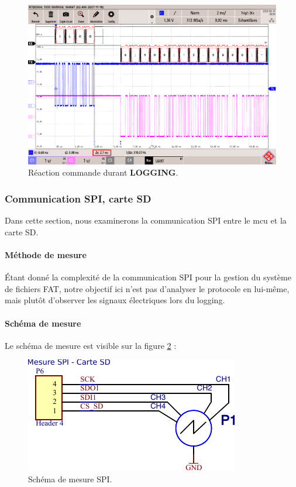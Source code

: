 \begin{figure}[h]
	\centering
	\includegraphics[width=0.7\linewidth]{../figures/mesures/UART-FTDI/comm-uart-ecartLog}
	\caption{Réaction commande durant \textbf{LOGGING}.}
	\label{fig:comm-uart-ecartlog}
\end{figure}



\subsubsection{Communication SPI, carte SD} \label{ssec:Comm-SPI}
Dans cette section, nous examinerons la communication SPI entre le \gls{mcu} et la carte SD.

\paragraph{Méthode de mesure} Étant donné la complexité de la communication SPI pour la gestion du système de fichiers FAT, notre objectif ici n'est pas d'analyser le protocole en lui-même, mais plutôt d'observer les signaux électriques lors du logging.

\paragraph{Schéma de mesure} Le schéma de mesure est visible sur la figure \ref{fig:schema-mesure-spi} :
\begin{figure}[h]
	\centering
	\includegraphics[width=0.5\linewidth]{../figures/mesures/SPI/Schema-mesure-spi}
	\caption{Schéma de mesure SPI.}
	\label{fig:schema-mesure-spi}
\end{figure}

